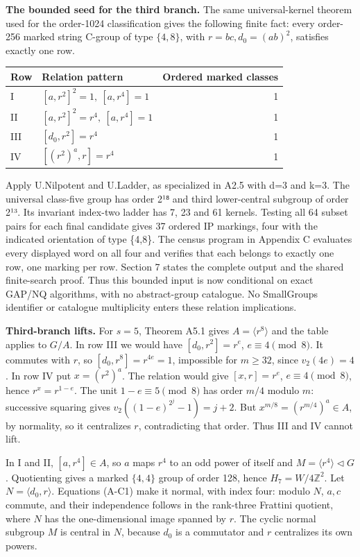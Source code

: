 \documentclass[
  11pt,
  a4paper,
]{article}
\newcounter{none} %
\begin{document}
\textbf{The bounded seed for the third branch.} The same
universal-kernel theorem used for the order-1024 classification gives
the following finite fact: every order-256 marked string C-group of type
\(\{4,8\}\), with \(r=bc,d_0=(ab)^2\), satisfies exactly one row.

{\def\LTcaptype{none} %
\begin{longtable}[]{@{}llr@{}}
\toprule\noalign{}
Row & Relation pattern & Ordered marked classes \\
\midrule\noalign{}
\endhead
\bottomrule\noalign{}
\endlastfoot
I & \([a,r^2]^2=1,\ [a,r^4]=1\) & 1 \\
II & \([a,r^2]^2=r^4,\ [a,r^4]=1\) & 1 \\
III & \([d_0,r^2]=r^4\) & 1 \\
IV & \([(r^2)^a,r]=r^4\) & 1 \\
\end{longtable}
}

Apply U.Nilpotent and U.Ladder, as specialized in A2.5 with d=3 and k=3.
The universal class-five group has order 2¹⁸ and third lower-central
subgroup of order 2¹³. Its invariant index-two ladder has 7, 23 and 61
kernels. Testing all 64 subset pairs for each final candidate gives 37
ordered IP markings, four with the indicated orientation of type
\{4,8\}. The census program in Appendix C evaluates every displayed word
on all four and verifies that each belongs to exactly one row, one
marking per row. Section 7 states the complete output and the shared
finite-search proof. Thus this bounded input is now conditional on exact
GAP/NQ algorithms, with no abstract-group catalogue. No SmallGroups
identifier or catalogue multiplicity enters these relation implications.

\textbf{Third-branch lifts.} For \(s=5\), Theorem A5.1 gives
\(A=\langle r^8\rangle\) and the table applies to \(G/A\). In row III we
would have \([d_0,r^2]=r^e\), \(e\equiv4\pmod8\). It commutes with
\(r\), so \([d_0,r^8]=r^{4e}=1\), impossible for \(m\ge32\), since
\(v_2(4e)=4\). In row IV put \(x=(r^2)^a\). The relation would give
\([x,r]=r^e\), \(e\equiv4\pmod8\), hence \(r^x=r^{1-e}\). The unit
\(1-e\equiv5\pmod8\) has order \(m/4\) modulo \(m\): successive squaring
gives \(v_2((1-e)^{2^j}-1)=j+2\). But \(x^{m/8}=(r^{m/4})^a\in A\), by
normality, so it centralizes \(r\), contradicting that order. Thus III
and IV cannot lift.

In I and II, \([a,r^4]\in A\), so \(a\) maps \(r^4\) to an odd power of
itself and \(M=\langle r^4\rangle\lhd G\). Quotienting gives a marked
\(\{4,4\}\) group of order 128, hence \(H_7=W/4\mathbb Z^2\). Let
\(N=\langle d_0,r\rangle\). Equations (A-C1) make it normal, with index
four: modulo \(N\), \(a,c\) commute, and their independence follows in
the rank-three Frattini quotient, where \(N\) has the one-dimensional
image spanned by \(r\). The cyclic normal subgroup \(M\) is central in
\(N\), because \(d_0\) is a commutator and \(r\) centralizes its own
powers.
\end{document}
